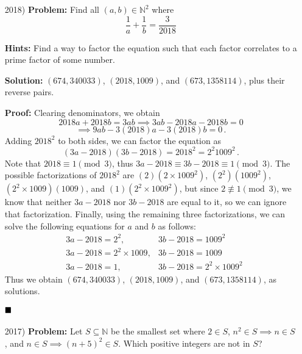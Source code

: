 \documentclass[12pt]{article}
\newcommand{\done}{
    \ensuremath{\strut\hfill\blacksquare}
}
\newcommand{\N}{\mathbb{N}}
\begin{document}

    \pagestyle{fancy}

    \begin{itemize}
        \item [2018)] \textbf{Problem:} Find all \( (a,b) \in \N^2 \) where
        \[ \frac{1}{a} + \frac{1}{b} = \frac{3}{2018} \]

        \textbf{Hints:} Find a way to factor the equation such that each factor
        correlates to a prime factor of some number.

        \textbf{Solution:} \( (674,340033) \), \( (2018,1009) \), and
        \( (673,1358114) \), plus their reverse pairs.

        \textbf{Proof:} Clearing denominators, we obtain
        \[ 2018a + 2018b = 3ab \implies 3ab - 2018a - 2018b = 0 \]
        \[ \implies 9ab - 3(2018)a - 3(2018)b = 0 \, . \]
        Adding \( 2018^2 \) to both sides, we can factor the equation as
        \[ (3a - 2018)(3b - 2018) = 2018^2 = 2^2 1009^2 \, . \] Note that
        \( 2018 \equiv 1 \pmod{3} \), thus
        \( 3a - 2018 \equiv 3b - 2018 \equiv 1 \pmod{3} \).
        The possible factorizations of \( 2018^2 \) are
        \( (2)( 2 \times 1009^2) \), \( (2^2)(1009^2) \),
        \( (2^2 \times 1009)(1009) \), and \( (1)( 2^2 \times 1009^2)\),
        but since \( 2 \not\equiv 1 \pmod{3} \),
        we know that neither \( 3a - 2018 \) nor \( 3b - 2018 \) are equal to
        it, so we can ignore that factorization. Finally, using the remaining
        three factorizations, we can solve the following equations for \( a \)
        and \( b \) as follows:
        \begin{align*}
            & 3a - 2018 = 2^2,             & 3b - 2018 = 1009^2 \\
            & 3a - 2018 = 2^2 \times 1009, & 3b - 2018 = 1009   \\
            & 3a - 2018 = 1,               & 3b - 2018 = 2^2 \times 1009^2
        \end{align*}
        Thus we obtain \( (674,340033) \), \( (2018,1009) \), and
        \( (673,1358114) \), as solutions.
        \done

        \item [2017)] \textbf{Problem:} Let \( S \subseteq \N \) be the
        smallest set where \( 2 \in S \), \( n^2 \in S \implies n \in S\), and
        \( n \in S \implies (n + 5)^2 \in S \). Which positive integers are not
        in \( S \)?


\end{itemize}
\end{document}
